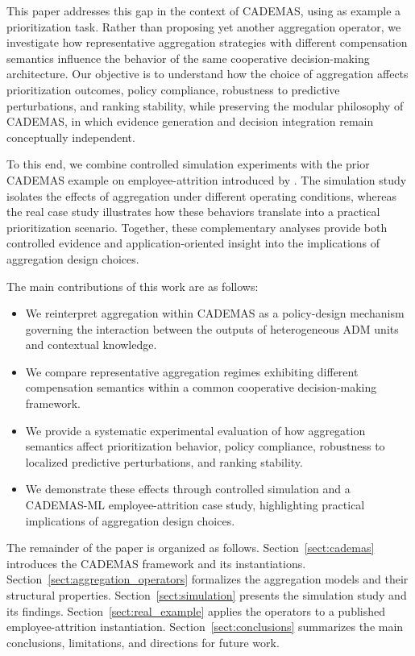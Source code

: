 \documentclass[mathematics,article,submit,moreauthors]{Definitions/mdpi}
\begin{document}
This paper addresses this gap in the context of CADEMAS, using as example a prioritization task. Rather than proposing yet another aggregation operator, we investigate how representative aggregation strategies with different compensation semantics influence the behavior of the same cooperative decision-making architecture. Our objective is to understand how the choice of aggregation affects prioritization outcomes, policy compliance, robustness to predictive perturbations, and ranking stability, while preserving the modular philosophy of CADEMAS, in which evidence generation and decision integration remain conceptually independent.

To this end, we combine controlled simulation experiments with the prior CADEMAS example on  employee-attrition introduced by \citet{Godz2026}. The simulation study isolates the effects of aggregation under different operating conditions, whereas the real case study illustrates how these behaviors translate into a practical prioritization scenario. Together, these complementary analyses provide both controlled evidence and application-oriented insight into the implications of aggregation design choices.

The main contributions of this work are as follows:

\begin{itemize}
\item We reinterpret aggregation within CADEMAS as a policy-design mechanism governing the interaction between the outputs of heterogeneous ADM units and contextual knowledge.

\item We compare representative aggregation regimes exhibiting different compensation semantics within a common cooperative decision-making framework.

\item We provide a systematic experimental evaluation of how aggregation semantics affect prioritization behavior, policy compliance, robustness to localized predictive perturbations, and ranking stability.

\item We demonstrate these effects through controlled simulation and a CADEMAS-ML employee-attrition case study, highlighting practical implications of aggregation design choices.

\end{itemize}

The remainder of the paper is organized as follows. Section~\ref{sect:cademas} introduces the CADEMAS framework and its instantiations. Section~\ref{sect:aggregation_operators} formalizes the aggregation models and their structural properties. Section~\ref{sect:simulation} presents the simulation study and its findings. Section~\ref{sect:real_example} applies the operators to a published employee-attrition instantiation. Section~\ref{sect:conclusions} summarizes the main conclusions, limitations, and directions for future work.
\end{document}
